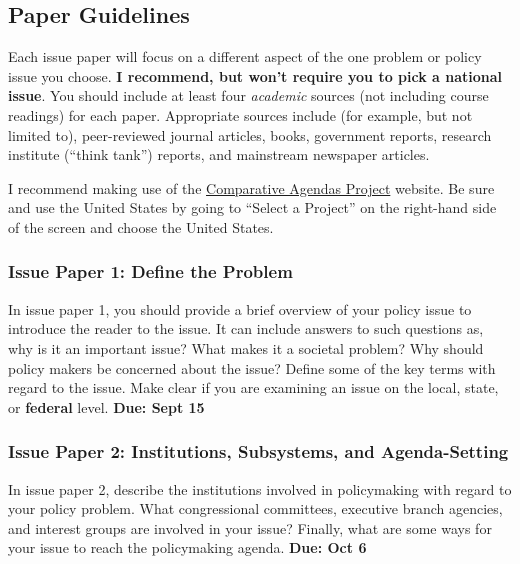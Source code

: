 \hypertarget{paper-guidelines}{%
\subsection{Paper Guidelines}\label{paper-guidelines}}

Each issue paper will focus on a different aspect of the one problem or
policy issue you choose. \textbf{I recommend, but won't require you to
pick a national issue}. You should include at least four \emph{academic}
sources (not including course readings) for each paper. Appropriate
sources include (for example, but not limited to), peer-reviewed journal
articles, books, government reports, research institute (``think tank'')
reports, and mainstream newspaper articles.

\vspace{0.1in}

\noindent I recommend making use of the
\href{https://www.comparativeagendas.net/}{Comparative Agendas Project}
website. Be sure and use the United States by going to ``Select a
Project'' on the right-hand side of the screen and choose the United
States.

\hypertarget{issue-paper-1-define-the-problem}{%
\subsubsection{Issue Paper 1: Define the
Problem}\label{issue-paper-1-define-the-problem}}

In issue paper 1, you should provide a brief overview of your policy
issue to introduce the reader to the issue. It can include answers to
such questions as, why is it an important issue? What makes it a
societal problem? Why should policy makers be concerned about the issue?
Define some of the key terms with regard to the issue. Make clear if you
are examining an issue on the local, state, or \textbf{federal} level.
\textbf{Due: Sept 15}

\hypertarget{issue-paper-2-institutions-subsystems-and-agenda-setting}{%
\subsubsection{Issue Paper 2: Institutions, Subsystems, and
Agenda-Setting}\label{issue-paper-2-institutions-subsystems-and-agenda-setting}}

In issue paper 2, describe the institutions involved in policymaking
with regard to your policy problem. What congressional committees,
executive branch agencies, and interest groups are involved in your
issue? Finally, what are some ways for your issue to reach the
policymaking agenda. \textbf{Due: Oct 6}

